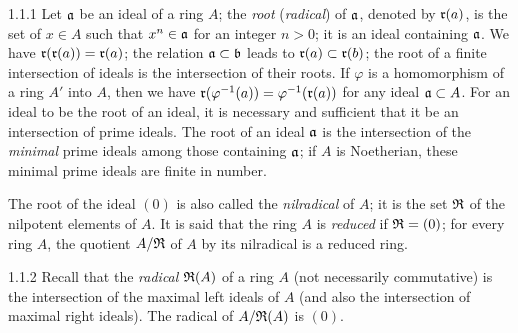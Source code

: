 \documentclass[../main.tex]{subfiles}
\begin{document}
\begin{cx}{1.1.1}
Let $\mathfrak{a}$ be an ideal of a ring $A$; the \emph{root} (\emph{radical}) of $\mathfrak{a}$, denoted
by $\mathfrak{r}(a)$, is the set of $x\in A$ such that $x^n\in\mathfrak{a}$ for an integer $n>0$; it is an
ideal containing $\mathfrak{a}$. We have $\mathfrak{r}(\mathfrak{r}(a))=\mathfrak{r}(a)$; the relation $\mathfrak{a}\subset\mathfrak{b}$
leads to $\mathfrak{r}(a)\subset\mathfrak{r}(b)$; the root of a finite intersection of ideals is the
intersection of their roots. If $\varphi$  is a homomorphism of a ring $A'$ into $A$, then we
have $\mathfrak{r}(\varphi^{-1}(a))=\varphi^{-1}(\mathfrak{r}(a))$
for any ideal $\mathfrak{a}\subset A$. For an ideal to be the root of an ideal,
it is necessary and sufficient that it be an intersection of prime ideals. The root of an
ideal $\mathfrak{a}$ is the intersection of the
\emph{minimal} prime ideals among those containing $\mathfrak{a}$; if $A$ is
Noetherian, these minimal prime ideals are finite in number.

The root of the ideal $(0)$ is also called the \emph{nilradical} of $A$; it is the set
$\mathfrak{R}$ of the nilpotent elements of $A$. It is said that the ring $A$ is \emph{reduced} if
$\mathfrak{R}=(0)$; for every ring $A$, the quotient $A/\mathfrak{R}$ of $A$ by its nilradical is a
reduced ring.
\end{cx}

\begin{cx}{1.1.2}
Recall that the \emph{radical} $\mathfrak{R}(A)$ of a ring $A$ (not necessarily commutative) is the
intersection of the maximal left ideals of $A$ (and also the intersection of maximal
right ideals). The radical of $A/\mathfrak{R}(A)$ is $(0)$.
\end{cx}
\end{document}
